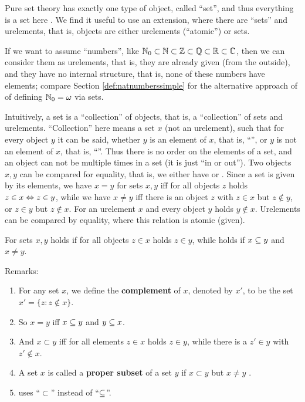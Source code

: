 \documentclass[12pt]{book}
\begin{document}
Pure set theory has exactly one type of object, called ``set'', and thus everything is a set here  \cite{h1}. We find it useful to use an 
extension, where there are ``sets'' and urelements, that is, objects are either urelements (``atomic'') or sets.
\begin{examp}\label{exp:urelemente}
      If we want to assume ``numbers'', like $\mathbb{N}_0 \subset \mathbb{N} \subset \mathbb{Z} \subset \mathbb{Q} \subset \mathbb{R} \subset \mathbb{C}$, then we can consider them 
	  as urelements, that is, they are already given (from the outside), and they have no internal structure, that is, none of these numbers 
	  have elements; compare Section \ref{def:natnumberssimple} for the alternative approach of of defining $\mathbb{N}_0 = \omega$ via sets.
\end{examp}
Intuitively, a set is a ``collection'' of objects, that is, a ``collection'' of sets and urelements. ``Collection'' here means a set $x$ 
(not an urelement), such that for every object $y$ it can be said, whether $y$ is an element of $x$, that is, ``'', or $y$ is 
not an element of $x$, that is, ``''. Thus there is no order on the elements of a set, and an object can not be multiple 
times in a set (it is just ``in or out''). Two objects $x, y$ can be compared for equality, that is, we either have  or . 
Since a set is given by its elements, we have $x = y$ for sets $x, y$ iff for all objects $z$ holds $z \in x \Leftrightarrow z \in y$, while we have $x \ne y$ 
iff there is an object $z$ with $z \in x$ but $z \notin y$, or $z \in y$ but $z \notin x$. For an urelement $x$ and every object $y$ holds $y \notin x$. 
Urelements can be compared by equality, where this relation is atomic (given).

\begin{defi}\label{def:sse}
      For sets $x, y$ holds  if for all objects $z \in x$ holds $z \in y$, while  holds if $x \subseteq y$ and $x \ne y$.
\end{defi}

Remarks:
\begin{enumerate}
      \item For any set $x$, we define the \textbf{complement} of $x$, denoted by $x'$, to be the set $x' = \{ z : z \not \in x \}$.
      \item So $x = y$ iff $x \subseteq y$ and $y \subseteq x$.
      \item And $x \subset y$ iff for all elements $z \in x$ holds $z \in y$, while there is a $z' \in y$ with $z' \notin x$.
      \item A set $x$ is called a \textbf{proper subset} of a set $y$ if $x \subset y$ but $x \not = y$ \cite{h3}. 
	  \item \cite{h2} uses ``$\subset$'' instead of ``$\subseteq$''.
\end{enumerate}
\end{document}
